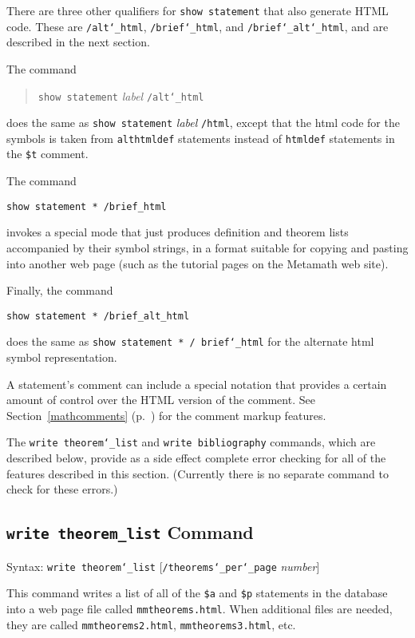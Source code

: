 There are three other qualifiers for \texttt{show statement} that also
generate {\sc HTML} code.  These are \texttt{/alt{\char`\_}html},
\texttt{/brief{\char`\_}html}, and
\texttt{/brief{\char`\_}alt{\char`\_}html}, and are described in the
next section.

The command
\begin{quote}
    \texttt{show statement} {\em label} \texttt{/alt{\char`\_}html}
\end{quote}
does the same as \texttt{show statement} {\em label} \texttt{/html},
except that the {\sc html} code for the symbols is taken from
\texttt{althtmldef} statements instead of \texttt{htmldef} statements in
the \texttt{\$t} comment.

The command
\begin{verbatim}
show statement * /brief_html
\end{verbatim}
invokes a special mode that just produces definition and theorem lists
accompanied by their symbol strings, in a format suitable for copying and
pasting into another web page (such as the tutorial pages on the
Metamath web site).

Finally, the command
\begin{verbatim}
show statement * /brief_alt_html
\end{verbatim}
does the same as \texttt{show statement * / brief{\char`\_}html}
for the alternate {\sc html}
symbol representation.

A statement's comment can include a special notation that provides a
certain amount of control over the {\sc HTML} version of the comment.  See
Section~\ref{mathcomments} (p.~\pageref{htmlmkup}) for the comment
markup features.

The \texttt{write theorem{\char`\_}list} and \texttt{write bibliography}
commands, which are described below, provide as a side effect complete
error checking for all of the features described in this section.
(Currently there is no separate command to check for these
errors.)

\subsection{\texttt{write theorem\_list}
Command}
Syntax:  \texttt{write theorem{\char`\_}list}
[\texttt{/theorems{\char`\_}per{\char`\_}page} {\em number}]

This command writes a list of all of the \texttt{\$a} and \texttt{\$p}
statements in the database into a web page file
 called \texttt{mmtheorems.html}.
When additional files are needed, they are called
\texttt{mmtheorems2.html}, \texttt{mmtheorems3.html}, etc.

